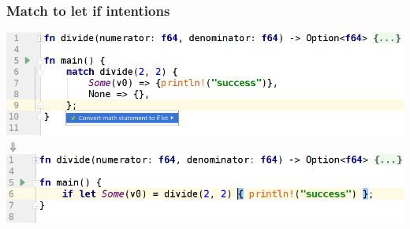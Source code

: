 \documentclass[10pt,pdf,hyperref={unicode}]{beamer}
\begin{document}
\begin{frame}
	\frametitle{Match to let if intentions} 
	\includegraphics[scale = 0.5]{match2let_if_before.png}\\
	{
	\centering
	$\Downarrow$ \\
	}
	\includegraphics[scale = 0.5]{match2let_if_after.png}
\end{frame}

\end{document}
